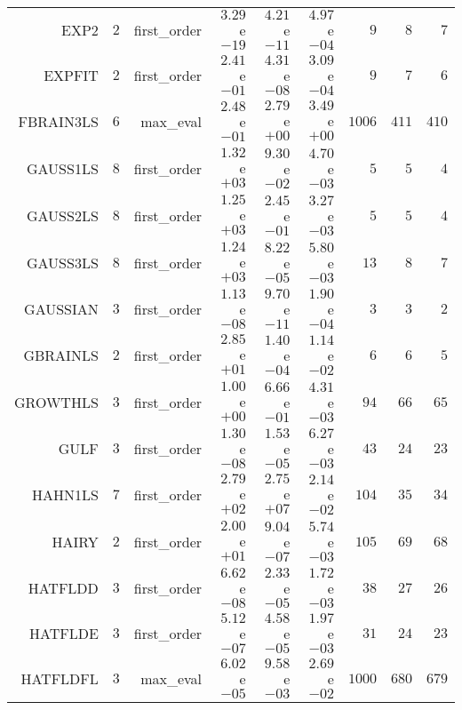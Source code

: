 \begin{longtable}{rrrrrrrrr}
EXP2 & \(     2\) & first\_order & \( 3.29\)e\(-19\) & \( 4.21\)e\(-11\) & \( 4.97\)e\(-04\) & \(     9\) & \(     8\) & \(     7\) \\
EXPFIT & \(     2\) & first\_order & \( 2.41\)e\(-01\) & \( 4.31\)e\(-08\) & \( 3.09\)e\(-04\) & \(     9\) & \(     7\) & \(     6\) \\
FBRAIN3LS & \(     6\) & max\_eval & \( 2.48\)e\(-01\) & \( 2.79\)e\(+00\) & \( 3.49\)e\(+00\) & \(  1006\) & \(   411\) & \(   410\) \\
GAUSS1LS & \(     8\) & first\_order & \( 1.32\)e\(+03\) & \( 9.30\)e\(-02\) & \( 4.70\)e\(-03\) & \(     5\) & \(     5\) & \(     4\) \\
GAUSS2LS & \(     8\) & first\_order & \( 1.25\)e\(+03\) & \( 2.45\)e\(-01\) & \( 3.27\)e\(-03\) & \(     5\) & \(     5\) & \(     4\) \\
GAUSS3LS & \(     8\) & first\_order & \( 1.24\)e\(+03\) & \( 8.22\)e\(-05\) & \( 5.80\)e\(-03\) & \(    13\) & \(     8\) & \(     7\) \\
GAUSSIAN & \(     3\) & first\_order & \( 1.13\)e\(-08\) & \( 9.70\)e\(-11\) & \( 1.90\)e\(-04\) & \(     3\) & \(     3\) & \(     2\) \\
GBRAINLS & \(     2\) & first\_order & \( 2.85\)e\(+01\) & \( 1.40\)e\(-04\) & \( 1.14\)e\(-02\) & \(     6\) & \(     6\) & \(     5\) \\
GROWTHLS & \(     3\) & first\_order & \( 1.00\)e\(+00\) & \( 6.66\)e\(-01\) & \( 4.31\)e\(-03\) & \(    94\) & \(    66\) & \(    65\) \\
GULF & \(     3\) & first\_order & \( 1.30\)e\(-08\) & \( 1.53\)e\(-05\) & \( 6.27\)e\(-03\) & \(    43\) & \(    24\) & \(    23\) \\
HAHN1LS & \(     7\) & first\_order & \( 2.79\)e\(+02\) & \( 2.75\)e\(+07\) & \( 2.14\)e\(-02\) & \(   104\) & \(    35\) & \(    34\) \\
HAIRY & \(     2\) & first\_order & \( 2.00\)e\(+01\) & \( 9.04\)e\(-07\) & \( 5.74\)e\(-03\) & \(   105\) & \(    69\) & \(    68\) \\
HATFLDD & \(     3\) & first\_order & \( 6.62\)e\(-08\) & \( 2.33\)e\(-05\) & \( 1.72\)e\(-03\) & \(    38\) & \(    27\) & \(    26\) \\
HATFLDE & \(     3\) & first\_order & \( 5.12\)e\(-07\) & \( 4.58\)e\(-05\) & \( 1.97\)e\(-03\) & \(    31\) & \(    24\) & \(    23\) \\
HATFLDFL & \(     3\) & max\_eval & \( 6.02\)e\(-05\) & \( 9.58\)e\(-03\) & \( 2.69\)e\(-02\) & \(  1000\) & \(   680\) & \(   679\) \\

\end{longtable}
